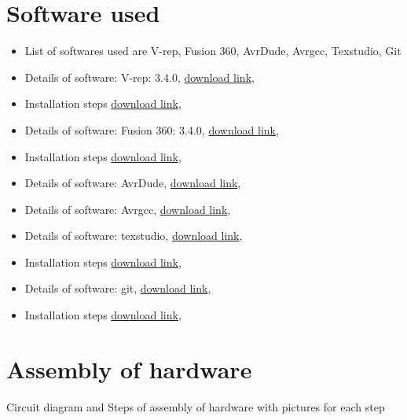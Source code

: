 \documentclass[a4paper,12pt,oneside]{book}
\begin{document}
\section{Software used}
\begin{itemize}
  \item List of softwares used are V-rep, Fusion 360, AvrDude, Avrgcc, Texstudio, Git 
  \item Details of software: V-rep: 3.4.0, \href{http://www.coppeliarobotics.com/}{download link}, 
  \item Installation steps \href{http://www.coppeliarobotics.com/resources.html}{download link},
  \item Details of software: Fusion 360: 3.4.0, \href{https://www.autodesk.com/products/fusion-360/students-teachers-educators}{download link},
  \item Installation steps \href{https://www.autodesk.com/products/fusion-360/students-teachers-educators}{download link},
  \item Details of software: AvrDude, \href{http://www.nongnu.org/avrdude/}{download link},
  \item Details of software: Avrgcc, \href{https://gcc.gnu.org/wiki/avr-gcc}{download link},
  \item Details of software: texstudio, \href{http://www.texstudio.org/}{download link},
  \item Installation steps \href{http://www.texstudio.org/}{download link},
  \item Details of software: git, \href{https://git-scm.com/}{download link},
  \item Installation steps \href{https://git-scm.com/}{download link},
\end{itemize}

\section{Assembly of hardware}
Circuit diagram and Steps of assembly of hardware with pictures for each step
\end{document}
